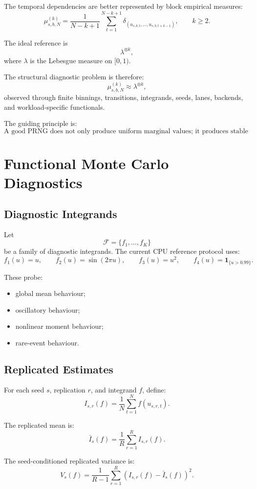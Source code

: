 \documentclass[11pt,a4paper]{article}
\begin{document}
The temporal dependencies are better represented by block empirical measures:
\[
\mu^{(k)}_{s,b,N}
=
\frac1{N-k+1}
\sum_{t=1}^{N-k+1}
\delta_{(u_{s,b,t},\ldots,u_{s,b,t+k-1})},
\qquad k\geq2.
\]

The ideal reference is
\[
\lambda^{\otimes k},
\]
where \(\lambda\) is the Lebesgue measure on \([0,1)\).

The structural diagnostic problem is therefore:
\[
\mu^{(k)}_{s,b,N}\approx \lambda^{\otimes k},
\]
observed through finite binnings, transitions, integrands, seeds, lanes, backends, and workload-specific functionals.

The guiding principle is:
\[
\boxed{
\text{A good PRNG does not only produce uniform marginal values; it produces stable empirical measures across seeds, backends, blocks, and workloads.}
}
\]

\section{Functional Monte Carlo Diagnostics}

\subsection{Diagnostic Integrands}

Let
\[
\mathcal F=\{f_1,\ldots,f_K\}
\]
be a family of diagnostic integrands. The current CPU reference protocol uses:
\[
f_1(u)=u,
\qquad
f_2(u)=\sin(2\pi u),
\qquad
f_3(u)=u^2,
\qquad
f_4(u)=\mathbf 1_{\{u>0.99\}}.
\]

These probe:
\begin{itemize}
  \item global mean behaviour;
  \item oscillatory behaviour;
  \item nonlinear moment behaviour;
  \item rare-event behaviour.
\end{itemize}

\subsection{Replicated Estimates}

For each seed \(s\), replication \(r\), and integrand \(f\), define:
\[
I_{s,r}(f)
=
\frac1N
\sum_{t=1}^{N}
f(u_{s,r,t}).
\]

The replicated mean is:
\[
\bar I_s(f)
=
\frac1R
\sum_{r=1}^{R}
I_{s,r}(f).
\]

The seed-conditioned replicated variance is:
\[
\boxed{
V_s(f)
=
\frac1{R-1}
\sum_{r=1}^{R}
\left(
I_{s,r}(f)-\bar I_s(f)
\right)^2.
}
\]
\end{document}
